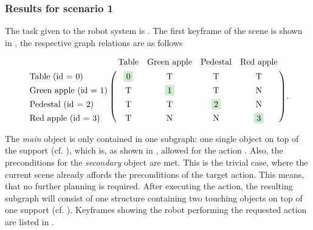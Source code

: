 \subsubsection{Results for scenario 1}

The task given to the robot system is .
The first keyframe of the scene is shown in , the respective graph relations are as follows

\begin{align*}
  \bordermatrix{
    & \textup{Table}     & \textup{Green apple}   & \textup{Pedestal}  & \textup{Red apple}\cr
    \textup{Table (id = 0)}        & \colorbox{green120}{0} & \textup{T} & \textup{T} & \textup{T}\cr
    \textup{Green apple (id = 1)} & \textup{T} & \colorbox{green120}{1} & \textup{T} & \textup{N}\cr
    \textup{Pedestal (id = 2)}     & \textup{T} & \textup{T} & \colorbox{green120}{2} & \textup{N}\cr
    \textup{Red apple (id = 3)}   & \textup{T} & \textup{N} & \textup{N} & \colorbox{green120}{3}\cr
    }.
\end{align*}

The \emph{main} object is only contained in one subgraph: one single object on top of the support (cf. ), which is, as shown in , allowed for the action .
Also, the preconditions for the \emph{secondary} object are met.
This is the trivial case, where the current scene already affords the preconditions of the target action.
This means, that no further planning is required.
After executing the action, the resulting subgraph will consist of one structure containing two touching objects on top of one support (cf. ).
Keyframes showing the robot performing the requested action are listed in . 

